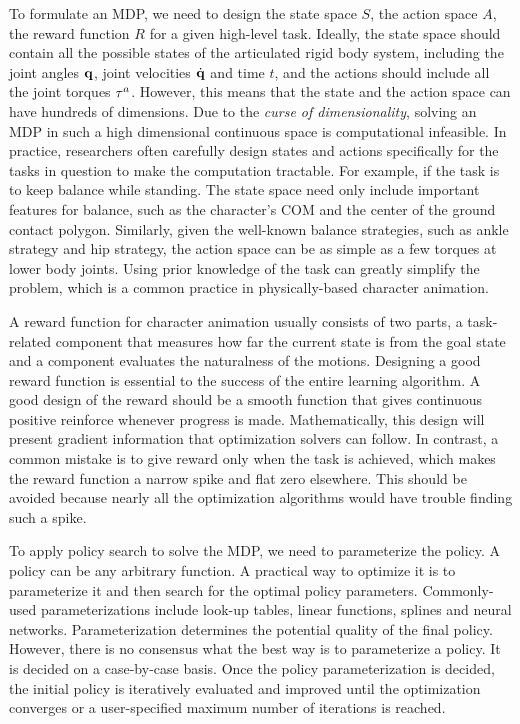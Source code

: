 To formulate an MDP, we need to design the state space $S$, the action space $A$, the reward function $R$ for a given high-level task. Ideally, the state space should contain all the possible states of the articulated rigid body system, including the joint angles $\mathbf{q}$, joint velocities $\dot{\mathbf{q}}$ and time $t$, and the actions should include all the joint torques $\mathbf{\tau}^a$. However, this means that the state and the action space can have hundreds of dimensions. Due to the \emph{curse of dimensionality}, solving an MDP in such a high dimensional continuous space is computational infeasible. In practice, researchers often carefully design states and actions specifically for the tasks in question to make the computation tractable. For example, if the task is to keep balance while standing. The state space need only include important features for balance, such as the character's COM and the center of the ground contact polygon. Similarly, given the well-known balance strategies, such as ankle strategy and hip strategy, the action space can be as simple as a few torques at lower body joints. Using prior knowledge of the task can greatly simplify the problem, which is a common practice in physically-based character animation. 

A reward function for character animation usually consists of two parts, a task-related component that measures how far the current state is from the goal state and a component evaluates the naturalness of the motions. Designing a good reward function is essential to the success of the entire learning algorithm. A good design of the reward should be a smooth function that gives continuous positive reinforce whenever progress is made. Mathematically, this design will present gradient information that optimization solvers can follow. In contrast, a common mistake is to give reward only when the task is achieved, which makes the reward function a narrow spike and flat zero elsewhere. This should be avoided because nearly all the optimization algorithms would have trouble finding such a spike.

To apply policy search to solve the MDP, we need to parameterize the policy. A policy can be any arbitrary function. A practical way to optimize it is to parameterize it and then search for the optimal policy parameters. Commonly-used parameterizations include look-up tables, linear functions, splines and neural networks. Parameterization determines the potential quality of the final policy. However, there is no consensus what the best way is to parameterize a policy. It is decided on a case-by-case basis. Once the policy parameterization is decided, the initial policy is iteratively evaluated and improved until the optimization converges or a user-specified maximum number of iterations is reached.

